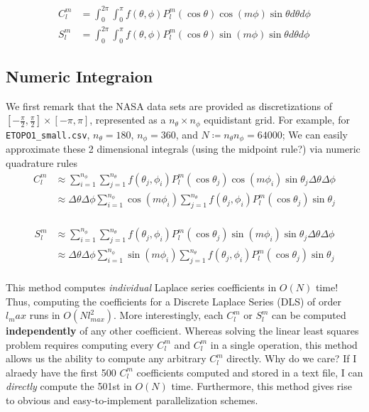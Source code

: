 \documentclass[a4paper]{article}
\theoremstyle{definition}
\begin{document}
\begin{align*}
    C_l^m &= \int_0^{2\pi}\int_0^\pi f(\theta, \phi) P_l^m (\cos \theta)\cos (m \phi) \sin \theta d\theta d\phi\\
    S_l^m &= \int_0^{2\pi}\int_0^\pi f(\theta, \phi) P_l^m (\cos \theta)\sin (m \phi) \sin \theta d\theta d\phi
\end{align*}

\subsection{Numeric Integraion}

We first remark that the NASA data sets are provided as discretizations of $[-\frac{\pi}{2}, \frac{\pi}{2}] \times [-\pi, \pi]$, represented as a $n_\theta \times n_\phi$ equidistant grid.
For example, for \verb|ETOPO1_small.csv|, $n_\theta = 180$, $n_\phi = 360$, and $N \coloneqq n_\theta n_\phi = 64000$;
We can easily approximate these 2 dimensional integrals (using the midpoint rule?) via numeric quadrature rules
\begin{align*}
    C_l^m &\approx \sum_{i = 1}^{n_\phi}\sum_{j = 1}^{n_\theta} f(\theta_j, \phi_i) P_l^m (\cos \theta_j)\cos (m \phi_i) \sin \theta_j \Delta\theta \Delta\phi\\
          &\approx \Delta\theta \Delta\phi\sum_{i = 1}^{n_\phi}\cos (m \phi_i)\sum_{j = 1}^{n_\theta} f(\theta_j, \phi_i) P_l^m (\cos \theta_j) \sin \theta_j\\
\end{align*}

\begin{align*}
    S_l^m &\approx \sum_{i = 1}^{n_\phi}\sum_{j = 1}^{n_\theta} f(\theta_j, \phi_i) P_l^m (\cos \theta_j)\sin (m \phi_i) \sin \theta_j \Delta\theta \Delta\phi\\
          &\approx \Delta\theta \Delta\phi\sum_{i = 1}^{n_\phi}\sin (m \phi_i)\sum_{j = 1}^{n_\theta} f(\theta_j, \phi_i) P_l^m (\cos \theta_j) \sin \theta_j\\
\end{align*}

This method computes \textit{individual} Laplace series coefficients in $O(N)$ time! Thus, computing the coefficients for a Discrete Laplace Series (DLS) of order $l_max$ runs in
$O(Nl^2_{max})$. More interestingly, each $C_l^m$ or $S_l^m$ can be computed \textbf{independently} of any other coefficient. Whereas solving the linear least squares problem requires computing
every $C_l^m$ and $C_l^m$ in a single operation, this method allows us the ability to compute any arbitrary $C_l^m$ directly. Why do we care? If I alraedy have the first 500 $C_l^m$ coefficients computed
and stored in a text file, I can \textit{directly} compute the 501st in $O(N)$ time. Furthermore, this method gives rise to obvious and easy-to-implement parallelization schemes.
\end{document}
